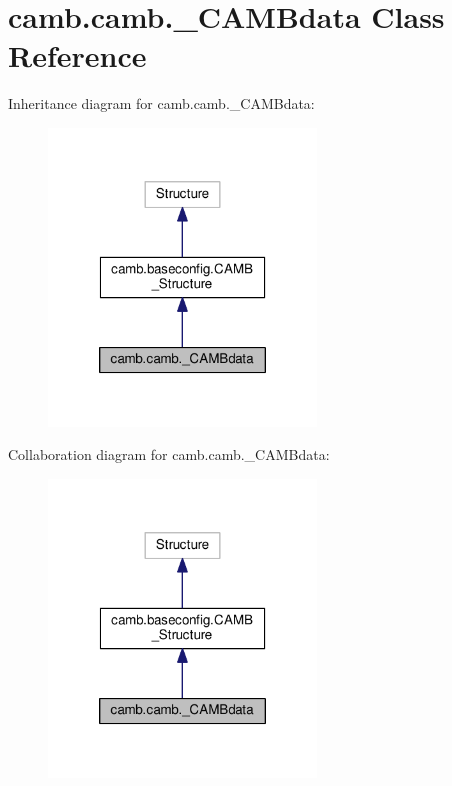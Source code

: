 \hypertarget{classcamb_1_1camb_1_1__CAMBdata}{}\section{camb.\+camb.\+\_\+\+C\+A\+M\+Bdata Class Reference}
\label{classcamb_1_1camb_1_1__CAMBdata}


Inheritance diagram for camb.\+camb.\+\_\+\+C\+A\+M\+Bdata\+:
\nopagebreak
\begin{figure}[H]
\begin{center}
\leavevmode
\includegraphics[width=202pt]{classcamb_1_1camb_1_1__CAMBdata__inherit__graph}
\end{center}
\end{figure}


Collaboration diagram for camb.\+camb.\+\_\+\+C\+A\+M\+Bdata\+:
\nopagebreak
\begin{figure}[H]
\begin{center}
\leavevmode
\includegraphics[width=202pt]{classcamb_1_1camb_1_1__CAMBdata__coll__graph}
\end{center}
\end{figure}
